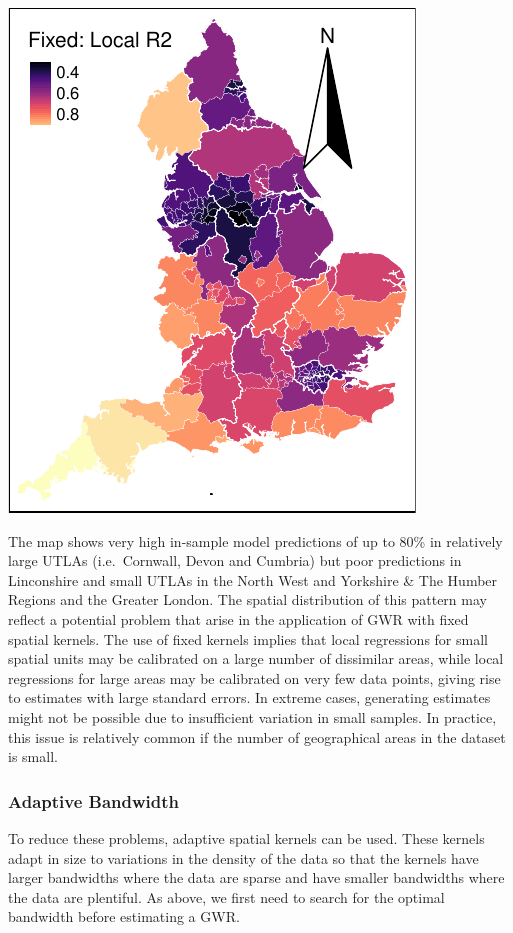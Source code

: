\documentclass[
  letterpaper,
  DIV=11,
  numbers=noendperiod,
  oneside]{scrreprt}
\begin{document}
\includegraphics{09-gwr_files/figure-pdf/unnamed-chunk-13-1.pdf}

The map shows very high in-sample model predictions of up to 80\% in
relatively large UTLAs (i.e.~Cornwall, Devon and Cumbria) but poor
predictions in Linconshire and small UTLAs in the North West and
Yorkshire \& The Humber Regions and the Greater London. The spatial
distribution of this pattern may reflect a potential problem that arise
in the application of GWR with fixed spatial kernels. The use of fixed
kernels implies that local regressions for small spatial units may be
calibrated on a large number of dissimilar areas, while local
regressions for large areas may be calibrated on very few data points,
giving rise to estimates with large standard errors. In extreme cases,
generating estimates might not be possible due to insufficient variation
in small samples. In practice, this issue is relatively common if the
number of geographical areas in the dataset is small.

\subsubsection{Adaptive Bandwidth}\label{adaptive-bandwidth}

To reduce these problems, adaptive spatial kernels can be used. These
kernels adapt in size to variations in the density of the data so that
the kernels have larger bandwidths where the data are sparse and have
smaller bandwidths where the data are plentiful. As above, we first need
to search for the optimal bandwidth before estimating a GWR.
\end{document}
